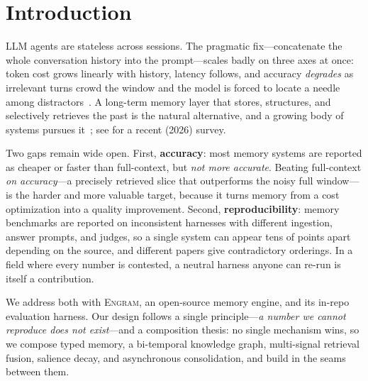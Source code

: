 \documentclass{article}
\newcommand{\engram}{\textsc{Engram}}
\begin{document}
\section{Introduction}

LLM agents are stateless across sessions. The pragmatic fix---concatenate the whole conversation history into
the prompt---scales badly on three axes at once: token cost grows linearly with history, latency follows, and
accuracy \emph{degrades} as irrelevant turns crowd the window and the model is forced to locate a needle among
distractors~\citep{liu2024lost}. A long-term memory layer that stores, structures, and selectively retrieves
the past is the natural alternative, and a growing body of systems pursues
it~\citep{packer2023memgpt,park2023generative,chhikara2025mem0,rasmussen2025zep,gutierrez2024hipporag};
see \citet{du2026memorysurvey} for a recent (2026) survey.

Two gaps remain wide open. First, \textbf{accuracy}: most memory systems are reported as cheaper or faster
than full-context, but \emph{not more accurate}. Beating full-context \emph{on accuracy}---a precisely
retrieved slice that outperforms the noisy full window---is the harder and more valuable target, because it
turns memory from a cost optimization into a quality improvement. Second, \textbf{reproducibility}: memory
benchmarks are reported on inconsistent harnesses with different ingestion, answer prompts, and judges, so a
single system can appear tens of points apart depending on the source, and different papers give
contradictory orderings. In a field where every number is contested, a neutral harness anyone can re-run is
itself a contribution.

We address both with \engram{}, an open-source memory engine, and its in-repo evaluation harness. Our design
follows a single principle---\emph{a number we cannot reproduce does not exist}---and a composition thesis:
no single mechanism wins, so we compose typed memory, a bi-temporal knowledge graph, multi-signal retrieval
fusion, salience decay, and asynchronous consolidation, and build in the seams between them.
\end{document}
